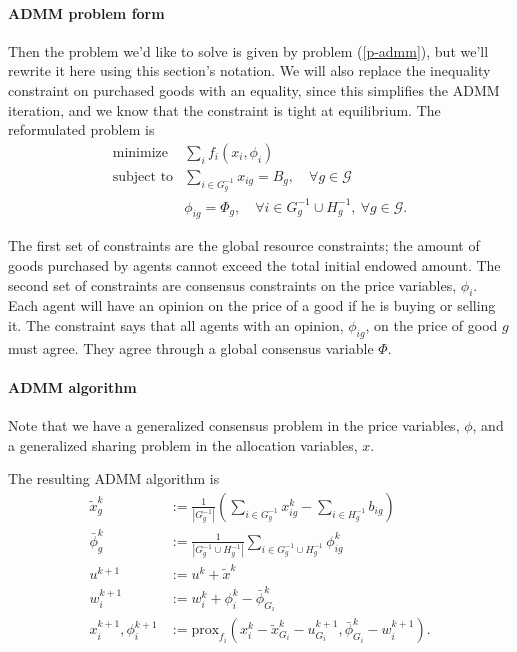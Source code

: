 \documentclass[12pt]{article}
\begin{document}
\paragraph{ADMM problem form} Then the problem we'd like to solve is given by
problem (\ref{p-admm}), but we'll rewrite it here using this section's notation.
We will also replace the inequality constraint on purchased goods with an
equality, since this simplifies the ADMM iteration, and we know that
the constraint is tight at equilibrium.
The reformulated problem is
\[
\begin{array}{ll}
\mbox{minimize} & \sum_i f_i(x_i, \phi_i) \\
\mbox{subject to} & \sum\limits_{i \in G^{-1}_g} x_{ig} = B_g,\quad \forall g \in \mathcal{G}\\
& \phi_{ig} = \Phi_g,\quad \forall i \in G^{-1}_g \cup H^{-1}_g,\ \forall g \in \mathcal{G}.
\end{array}
\]

The first set of constraints are the global resource constraints; the amount of
goods purchased by agents cannot exceed the total initial endowed amount.
The second set of constraints are consensus constraints on the price variables,
$\phi_i$.
Each agent will have an opinion on the price of a good if he is buying or selling it.
The constraint says that all agents with an opinion, $\phi_{ig}$, on the price
of good $g$ must agree.
They agree through a global consensus variable $\Phi$.


\paragraph{ADMM algorithm}
Note that we have a generalized consensus problem in the price variables,
$\phi$, and a generalized sharing problem in the allocation variables, $x$.

The resulting ADMM algorithm is 
\begin{align}
\label{a-xtild}
\tilde{x}^k_g &:= \frac{1}{|G^{-1}_g|} \left( \sum_{i \in G^{-1}_g} x^k_{ig} - \sum_{i \in H^{-1}_g} b_{ig}\right)\\
\label{a-phibar}
\bar{\phi}^k_g &:= \frac{1}{ |G^{-1}_g \cup H^{-1}_g| } \sum_{i \in G^{-1}_g \cup H^{-1}_g}\phi^k_{ig}\\
u^{k+1} &:= u^k + \tilde{x}^k\\
w_i^{k+1} &:= w_i^k + \phi^k_i - \bar{\phi}^k_{G_i}\\
\label{a-prox}
x_i^{k+1}, \phi_i^{k+1} &:= \mbox{prox}_{f_i}(x_i^k - \tilde{x}^k_{G_i} - u^{k+1}_{G_i},
\bar{\phi}^k_{G_i} - w_i^{k+1}).
\end{align}
\end{document}
